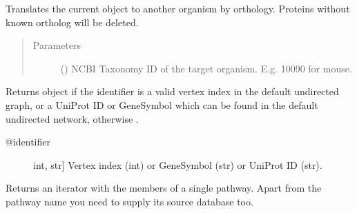 \documentclass[letterpaper,10pt,english]{sphinxmanual}
\begin{document}
\begin{fulllineitems}
\begin{fulllineitems}
\label{\detokenize{main:pypath.main.PyPath.orthology_translation}}
Translates the current object to another organism by orthology.
Proteins without known ortholog will be deleted.
\begin{quote}\begin{description}
\item[{Parameters}] \leavevmode
{} () \textendash{} NCBI Taxonomy ID of the target organism.
E.g. 10090 for mouse.

\end{description}\end{quote}

\end{fulllineitems}


\begin{fulllineitems}
\label{\detokenize{main:pypath.main.PyPath.p}}
Returns  object if the identifier
is a valid vertex index in the default undirected graph,
or a UniProt ID or GeneSymbol which can be found in the
default undirected network, otherwise .
\begin{description}
\item[{@identifier}] \leavevmode{[}int, str{]}
Vertex index (int) or GeneSymbol (str) or UniProt ID (str).

\end{description}

\end{fulllineitems}


\begin{fulllineitems}
\label{\detokenize{main:pypath.main.PyPath.pathway_members}}
Returns an iterator with the members of a single pathway.
Apart from the pathway name you need to supply its source
database too.

\end{fulllineitems}


\end{fulllineitems}
\end{document}
